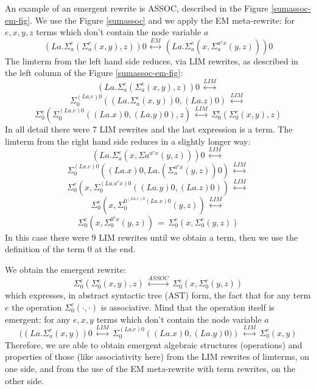 An example of an emergent rewrite is ASSOC, described in the Figure \ref{sumassoc-em-fig}. We use the Figure \ref{sumassoc} and we apply the EM meta-rewrite: for $e, x, y, z$ terms which don't contain the node variable $a$ 
$$ \displaystyle \left(La.\Sigma_{a}^{e}\left( \Sigma_{a}^{e}\left(x,y\right), z\right)\right) 0 \, \stackrel{EM}{\longleftrightarrow} \, \left(La.\Sigma_{a}^{e}\left( x, \Sigma_{a}^{a^{e} x} \left( y,z\right)\right)\right) 0 $$
The limterm from the left hand side reduces, via LIM rewrites, as described in the left column of the Figure \ref{sumassoc-em-fig}: 
$$ \displaystyle \left(La.\Sigma_{a}^{e}\left( \Sigma_{a}^{e}\left(x,y\right), z\right)\right) 0 \, \stackrel{LIM}{\longleftrightarrow} \, $$ 
$$ \Sigma_{0}^{(La.e)0}\left( \left( La.\Sigma_{a}^{e}\left(x,y\right)\right) 0, (La.z)0\right) \, \stackrel{LIM}{\longleftrightarrow} \, $$ 
$$\Sigma_{0}^{e}\left( \Sigma_{0}^{(La.e) 0}\left((La.x)0,(La.y)0\right), z\right) \, \stackrel{LIM}{\longleftrightarrow} \, \Sigma_{0}^{e}\left( \Sigma_{0}^{e}\left(x,y\right), z\right)$$
In all detail there were 7 LIM rewrites and the last expression is a term. The limterm from the right hand side reduces in a slightly longer way: 
$$ \displaystyle  \left(La.\Sigma_{a}^{e}\left( x, \Sigma{a}^{a^{e} x} \left( y,z\right)\right)\right) 0 \, \stackrel{LIM}{\longleftrightarrow} \, $$ 
$$\Sigma_{0}^{(La.e) 0}\left( (La.x)0, La.\left(\Sigma_{a}^{a^{e} x} \left( y,z\right)\right) 0\right) \, \stackrel{LIM}{\longleftrightarrow} \, $$ 
$$ \Sigma_{0}^{e}\left( x , \Sigma_{0}^{\left(La.a^{e} x\right) 0} \left( (La.y) 0, (La.z) 0\right)\right) \, \stackrel{LIM}{\longleftrightarrow} \, $$
$$ \Sigma_{0}^{e}\left( x , \Sigma_{0}^{0^{(La.e) 0} (La.x) 0} \left( y, z\right)\right) \, \stackrel{LIM}{\longleftrightarrow} \, $$
$$ \Sigma_{0}^{e}\left( x , \Sigma_{0}^{0^{e} x} \left( y, z\right)\right) \, = \, \Sigma_{0}^{e}\left( x , \Sigma_{0}^{e} \left( y, z\right)\right)   $$
In this case there were 9 LIM rewrites until we obtain a term, then we use the definition of the term $0$ at the end.

We obtain the emergent rewrite: 
$$\Sigma_{0}^{e}\left( \Sigma_{0}^{e}\left(x,y\right), z\right) \, \stackrel{ASSOC}{\longleftrightarrow} \, \Sigma_{0}^{e}\left( x , \Sigma_{0}^{e} \left( y, z\right)\right)   $$
which expresses, in abstract syntactic tree (AST) form, the fact that for any term $e$ the operation $\displaystyle \Sigma_{0}^{e}(\cdot, \cdot)$ is associative. Mind that the operation itself is emergent: for any $e, x, y$ terms which don't contain the node variable $a$ 
$$(\left(La. \Sigma_{a}^{e}(x,y)\right) 0  \, \stackrel{LIM}{\longleftrightarrow} \, \Sigma_{0}^{(La.e) 0} \left((La.x) 0 , (La.y) 0) \right)  \, \stackrel{LIM}{\longleftrightarrow} \, \Sigma_{0}^{e}(x,y)$$
Therefore, we are able to obtain emergent algebraic structures (operations) and properties of those (like associativity here) from the LIM rewrites of limterms, on one side, and from the use of the EM meta-rewrite with term rewrites, on the other side. 

